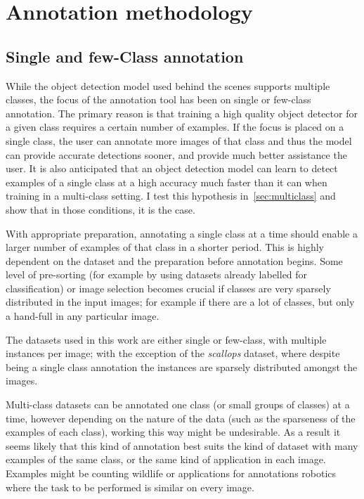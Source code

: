 \section{Annotation methodology}
\label{sec:annotation_methodology}


\subsection{Single and few-Class annotation}
\label{sec:single_class}

While the object detection model used behind the scenes supports multiple classes, the focus of the annotation tool has been on single or few-class annotation. The primary reason is that training a high quality object detector for a given class requires a certain number of examples. If the focus is placed on a single class, the user can annotate more images of that class and thus the model can provide accurate detections sooner, and provide much better assistance the user. It is also anticipated that an object detection model can learn to detect examples of a single class at a high accuracy much faster than it can when training in a multi-class setting. I test this hypothesis in~\ref{sec:multiclass} and show that in those conditions, it is the case.

With appropriate preparation, annotating a single class at a time should enable a larger number of examples of that class in a shorter period. This is highly dependent on the dataset and the preparation before annotation begins. Some level of pre-sorting (for example by using datasets already labelled for classification) or image selection becomes crucial if classes are very sparsely distributed in the input images; for example if there are a lot of classes, but only a hand-full in any particular image.

The datasets used in this work are either single or few-class, with multiple instances per image; with the exception of the \emph{scallops} dataset, where despite being a single class annotation the instances are sparsely distributed amongst the images.

Multi-class datasets can be annotated one class (or small groups of classes) at a time, however depending on the nature of the data (such as the sparseness of the examples of each class), working this way might be undesirable. As a result it seems likely that this kind of annotation best suits the kind of dataset with many examples of the same class, or the same kind of application in each image. Examples might be counting wildlife or applications for annotations robotics where the task to be performed is similar on every image.


